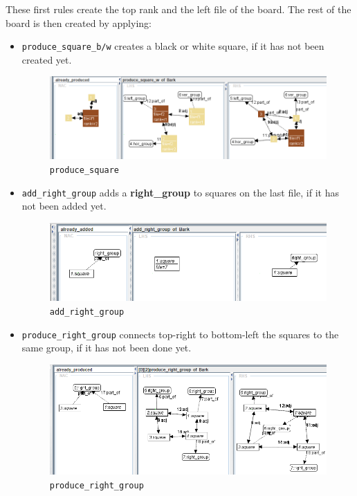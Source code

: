 \documentclass[a4paper]{scrartcl}
\newcommand{\noderepr}[1]{\textsf{\textbf{#1}}}
\begin{document}
    These first rules create the top rank and the left file of the board. The rest of the board is then created by applying:
    \begin{itemize}
        \item \texttt{produce\_square\_b/w} creates a black or white square, if it has not been created yet.
        \begin{figure}[H]
            \centering
            \includegraphics[width=.8\linewidth]{images/produce_square.png}
            \caption{\texttt{produce\_square}}
        \end{figure}

        \item \texttt{add\_right\_group} adds a \noderepr{right\_group} to squares on the last file, if it has not been added yet.
        \begin{figure}[H]
            \centering
            \includegraphics[width=.8\linewidth]{images/add_right_group.png}
            \caption{\texttt{add\_right\_group}}
        \end{figure}

        \item \texttt{produce\_right\_group} connects top-right to bottom-left the squares to the same group, if it has not been done yet.
        \begin{figure}[H]
            \centering
            \includegraphics[width=.8\linewidth]{images/produce_right_group.png}
            \caption{\texttt{produce\_right\_group}}
        \end{figure}
    \end{itemize}
\end{document}
